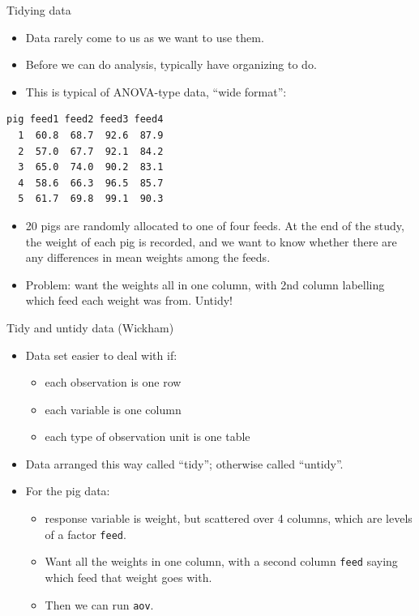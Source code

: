 \documentclass[
  ignorenonframetext,
]{beamer}
\providecommand{\tightlist}{%
  \setlength{\itemsep}{0pt}\setlength{\parskip}{0pt}}
\begin{document}
\begin{frame}[fragile]{Tidying data}
\protect\hypertarget{tidying-data}{}

\begin{itemize}
\tightlist
\item
  Data rarely come to us as we want to use them.
\item
  Before we can do analysis, typically have organizing to do.
\item
  This is typical of ANOVA-type data, ``wide format'':
\end{itemize}

\begin{verbatim}
pig feed1 feed2 feed3 feed4
  1  60.8  68.7  92.6  87.9
  2  57.0  67.7  92.1  84.2
  3  65.0  74.0  90.2  83.1
  4  58.6  66.3  96.5  85.7
  5  61.7  69.8  99.1  90.3
\end{verbatim}

\begin{itemize}
\tightlist
\item
  20 pigs are randomly allocated to one of four feeds. At the end of the
  study, the weight of each pig is recorded, and we want to know whether
  there are any differences in mean weights among the feeds.
\item
  Problem: want the weights all in one column, with 2nd column labelling
  which feed each weight was from. Untidy!
\end{itemize}

\end{frame}

\begin{frame}[fragile]{Tidy and untidy data (Wickham)}
\protect\hypertarget{tidy-and-untidy-data-wickham}{}

\begin{itemize}
\tightlist
\item
  Data set easier to deal with if:

  \begin{itemize}
  \tightlist
  \item
    each observation is one row
  \item
    each variable is one column
  \item
    each type of observation unit is one table
  \end{itemize}
\item
  Data arranged this way called ``tidy''; otherwise called ``untidy''.
\item
  For the pig data:

  \begin{itemize}
  \tightlist
  \item
    response variable is weight, but scattered over 4 columns, which are
    levels of a factor \texttt{feed}.
  \item
    Want all the weights in one column, with a second column
    \texttt{feed} saying which feed that weight goes with.
  \item
    Then we can run \texttt{aov}.
  \end{itemize}
\end{itemize}

\end{frame}
\end{document}
